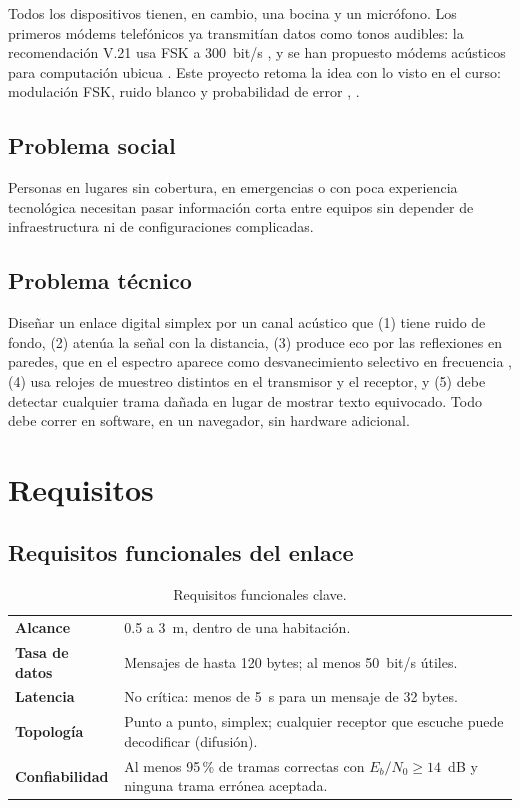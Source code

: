 \documentclass[10pt,twocolumn,letterpaper]{article}
\begin{document}
Todos los dispositivos tienen, en cambio, una bocina y un micrófono. Los primeros módems telefónicos ya transmitían datos como tonos audibles: la recomendación V.21 usa FSK a 300~bit/s \cite{v21}, y se han propuesto módems acústicos para computación ubicua \cite{lopes}. Este proyecto retoma la idea con lo visto en el curso: modulación FSK, ruido blanco y probabilidad de error \cite{proakis}, \cite{curso}.

\subsection{Problema social}
Personas en lugares sin cobertura, en emergencias o con poca experiencia tecnológica necesitan pasar información corta entre equipos sin depender de infraestructura ni de configuraciones complicadas.

\subsection{Problema técnico}
Diseñar un enlace digital simplex por un canal acústico que (1) tiene ruido de fondo, (2) atenúa la señal con la distancia, (3) produce eco por las reflexiones en paredes, que en el espectro aparece como desvanecimiento selectivo en frecuencia \cite{kuttruff}, (4) usa relojes de muestreo distintos en el transmisor y el receptor, y (5) debe detectar cualquier trama dañada en lugar de mostrar texto equivocado. Todo debe correr en software, en un navegador, sin hardware adicional.

\section{Requisitos}
\subsection{Requisitos funcionales del enlace}
\begin{table}[h]
\centering\small
\caption{Requisitos funcionales clave.}\label{tab:req}
\begin{tabularx}{\columnwidth}{@{}>{\bfseries}p{2.15cm}X@{}}
\toprule
Alcance & 0.5 a 3~m, dentro de una habitación. \\
Tasa de datos & Mensajes de hasta 120 bytes; al menos 50~bit/s útiles. \\
Latencia & No crítica: menos de 5~s para un mensaje de 32 bytes. \\
Topología & Punto a punto, simplex; cualquier receptor que escuche puede decodificar (difusión). \\
Confiabilidad & Al menos 95\,\% de tramas correctas con $E_b/N_0 \geq 14$~dB y ninguna trama errónea aceptada. \\
\bottomrule
\end{tabularx}
\end{table}
\end{document}
